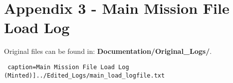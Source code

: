 \documentclass{article}
\begin{document}
\section*{Appendix 3 - Main Mission File Load Log}

Original files can be found in: \textbf{Documentation/Original\_Logs/}.

\texttt{ caption=Main Mission File Load Log (Minted)]{../Edited_Logs/main_load_logfile.txt}}
\end{document}
